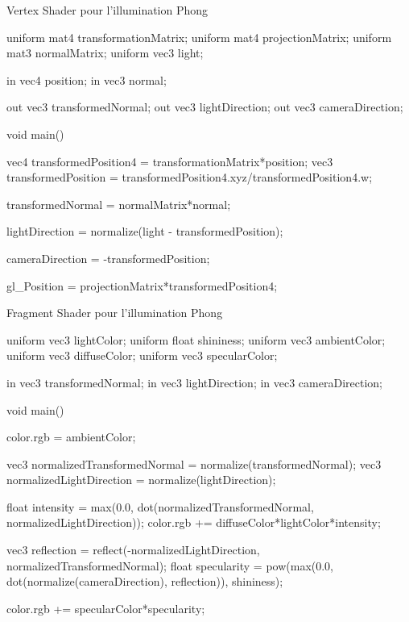 \documentclass[compress]{beamer}
\begin{document}
\begin{frame}[fragile]{Vertex Shader pour l'illumination Phong}

\begin{glslcode}
uniform mat4 transformationMatrix;
uniform mat4 projectionMatrix;
uniform mat3 normalMatrix;
uniform vec3 light;

in vec4 position;
in vec3 normal;

out vec3 transformedNormal;
out vec3 lightDirection;
out vec3 cameraDirection;

void main() {
    vec4 transformedPosition4 = transformationMatrix*position;
    vec3 transformedPosition = transformedPosition4.xyz/transformedPosition4.w;

    transformedNormal = normalMatrix*normal;

    lightDirection = normalize(light - transformedPosition);

    cameraDirection = -transformedPosition;

    gl_Position = projectionMatrix*transformedPosition4;
}
\end{glslcode}

\end{frame}

\begin{frame}[fragile]{Fragment Shader pour l'illumination Phong}

\begin{glslcode}
uniform vec3 lightColor;
uniform float shininess;
uniform vec3 ambientColor;
uniform vec3 diffuseColor;
uniform vec3 specularColor;

in vec3 transformedNormal;
in vec3 lightDirection;
in vec3 cameraDirection;

void main() {
    color.rgb = ambientColor;

    vec3 normalizedTransformedNormal = normalize(transformedNormal);
    vec3 normalizedLightDirection = normalize(lightDirection);

    float intensity = max(0.0, dot(normalizedTransformedNormal, normalizedLightDirection));
    color.rgb += diffuseColor*lightColor*intensity;

    vec3 reflection = reflect(-normalizedLightDirection, normalizedTransformedNormal);
    float specularity = pow(max(0.0, dot(normalize(cameraDirection), reflection)), shininess);

    color.rgb += specularColor*specularity;
}
\end{glslcode}

\end{frame}
\end{document}
